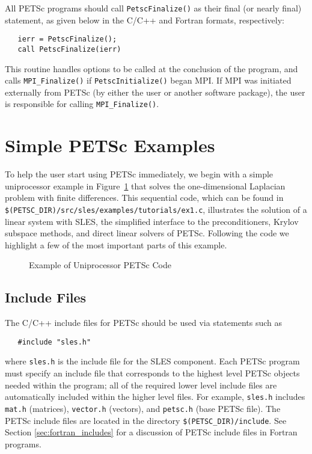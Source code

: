 All PETSc programs should call {\tt PetscFinalize()} 
as their final (or nearly final) statement, as given below in the C/C++
and Fortran formats, respectively:
\begin{verbatim}
   ierr = PetscFinalize();
   call PetscFinalize(ierr)
\end{verbatim}
This routine handles options to be called at the conclusion of
the program, and calls {\tt MPI\_Finalize()} 
if {\tt PetscInitialize()}
began MPI. If MPI was initiated externally from PETSc (by either
the user or another software package), the user is
responsible for calling {\tt MPI\_Finalize()}. 

\section{Simple PETSc Examples}

\label{sec:simple}

To help the user start using PETSc immediately, we begin with a simple
uniprocessor example in Figure~\ref{fig:example1} that solves the
one-dimensional Laplacian problem with finite differences.  This
sequential code, which can be found in 
{\tt \$(PETSC\_DIR)/src/sles/examples/tutorials/ex1.c},
illustrates the solution of a linear system with SLES, the simplified
interface to the preconditioners, Krylov subspace methods, and direct
linear solvers of PETSc.  Following the code we highlight a few of the most important
parts of this example.  

\begin{figure}[H]
{\footnotesize
{}
}
\caption{Example of Uniprocessor PETSc Code}
\label{fig:example1}
\end{figure}

\subsection*{Include Files}

The C/C++ include files for PETSc should be used via statements such as
\begin{verbatim}
   #include "sles.h"
\end{verbatim}
where {\tt sles.h} is the include file for the SLES component.
Each PETSc program must specify an
include file that corresponds to the highest level PETSc objects
needed within the program; all of the required lower level include
files are automatically included within the higher level files.  For
example, {\tt sles.h} includes {\tt mat.h} (matrices),
{\tt vector.h} (vectors), and {\tt petsc.h} (base PETSc file).  
The PETSc include files are located in the directory 
{\tt \$(PETSC\_DIR)/include}.  See Section \ref{sec:fortran_includes}
for a discussion of PETSc include files in Fortran programs.

